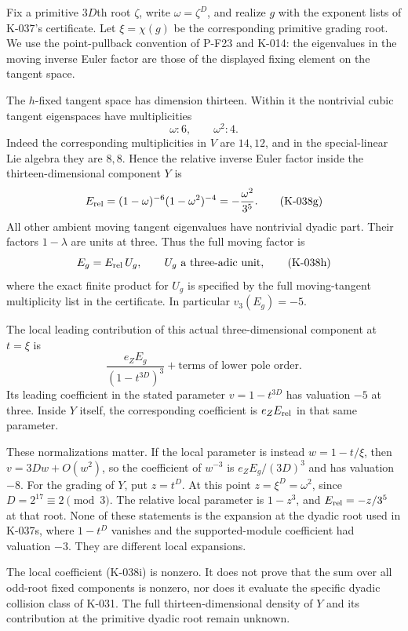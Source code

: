 Fix a primitive $3D$th root $\zeta$, write
$\omega=\zeta^D$, and realize $g$ with the exponent
lists of K-037's certificate. Let
$\xi=\chi(g)$ be the corresponding primitive grading
root. We use the point-pullback convention of P-F23
and K-014: the eigenvalues in the moving inverse Euler
factor are those of the displayed fixing element on
the tangent space.

The $h$-fixed tangent space has dimension thirteen.
Within it the nontrivial cubic tangent eigenspaces
have multiplicities
\[
                     \omega:6,\qquad\omega^2:4.          \tag{K-038f}
\]
Indeed the corresponding multiplicities in $V$ are
$14,12$, and in the special-linear Lie algebra they
are $8,8$. Hence the relative inverse Euler factor
inside the thirteen-dimensional component $Y$ is
\[
 E_{\rm rel}
   =(1-\omega)^{-6}(1-\omega^2)^{-4}
                    =-\frac{\omega^2}{3^5}.             \tag{K-038g}
\]
All other ambient moving tangent eigenvalues have
nontrivial dyadic part. Their factors $1-\lambda$
are units at three. Thus the full moving factor is
\[
                 E_g=E_{\rm rel}\,U_g,\qquad
                 U_g\text{ a three-adic unit},           \tag{K-038h}
\]
where the exact finite product for $U_g$ is specified
by the full moving-tangent multiplicity list in the
certificate. In particular $v_3(E_g)=-5$.

The local leading contribution of this actual
three-dimensional component at $t=\xi$ is
\[
                     \frac{e_ZE_g}{(1-t^{3D})^3}
               +\text{terms of lower pole order}.       \tag{K-038i}
\]
Its leading coefficient in the stated parameter
$v=1-t^{3D}$ has valuation $-5$ at three.
Inside $Y$ itself, the corresponding coefficient is
$e_ZE_{\rm rel}$ in that same parameter.

These normalizations matter. If the local parameter
is instead $w=1-t/\xi$, then
$v=3Dw+O(w^2)$, so the coefficient of $w^{-3}$ is
$e_ZE_g/(3D)^3$ and has valuation $-8$.
For the grading of $Y$, put $z=t^D$. At this point
$z=\xi^D=\omega^2$, since $D=2^{17}\equiv2\pmod3$.
The relative local parameter is $1-z^3$, and
$E_{\rm rel}=-z/3^5$ at that root.
None of these statements is the expansion at the
dyadic root used in K-037s, where $1-t^D$ vanishes
and the supported-module coefficient had valuation
$-3$. They are different local expansions.

The local coefficient (K-038i) is nonzero. It does
not prove that the sum over all odd-root fixed
components is nonzero, nor does it evaluate the
specific dyadic collision class of K-031.
The full thirteen-dimensional density of $Y$ and
its contribution at the primitive dyadic root remain
unknown.

